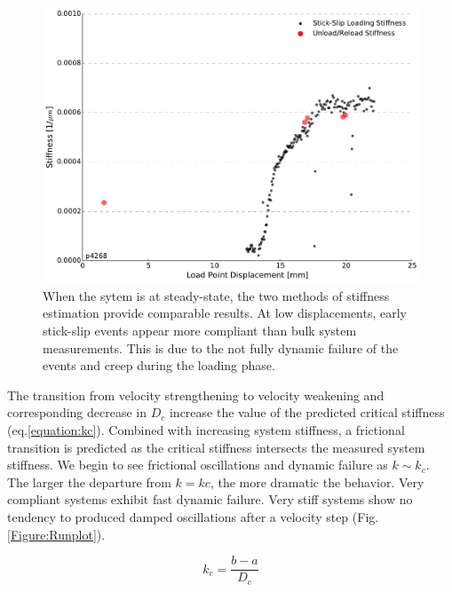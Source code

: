 \documentclass[11pt]{article}
\begin{document}
\begin{figure}
    \centering
        \includegraphics[scale=0.4]{../Figures/Fig_Stiffness_Methods/Stiffness_Methods.pdf}
       \caption{When the sytem is at steady-state, the two methods of stiffness
       estimation provide comparable results. At low displacements, early stick-slip
       events appear more compliant than bulk system measurements. This is due to the
       not fully dynamic failure of the events and creep during the loading phase.}
      \label{Figure:Stiffness Methods}
\end{figure}

The transition from velocity strengthening to velocity weakening and
corresponding decrease in $D_c$ increase the value of the predicted critical
stiffness (eq.\ref{equation:kc}). Combined with increasing system stiffness,
a frictional transition is predicted as the critical stiffness intersects the
measured system stiffness. We begin to see frictional oscillations and dynamic
failure as $k \sim k_c$. The larger the departure from $k=kc$, the more dramatic the behavior.
Very compliant systems exhibit fast dynamic failure. Very stiff systems show no
tendency to produced damped oscillations after a
velocity step (Fig.\ref{Figure:Runplot}).

\begin{equation}
    k_c = \frac{b-a}{D_c}
	\label{equation:kc}
\end{equation}
\end{document}
